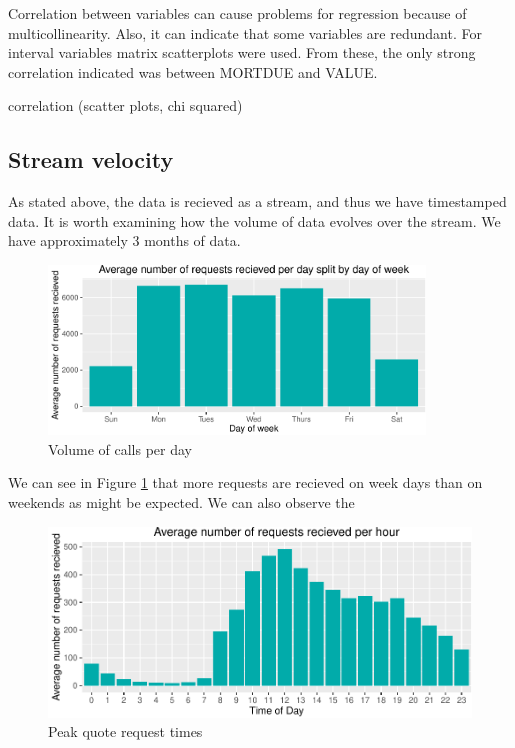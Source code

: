 Correlation between variables can cause problems for regression because of multicollinearity. Also, it can indicate that some variables are redundant. For interval variables matrix scatterplots were used. From these, the only strong correlation indicated was between MORTDUE and VALUE.



correlation (scatter plots, chi squared)


\subsection{Stream velocity}
\label{streaming-aspect}

As stated above, the data is recieved as a stream, and thus we have timestamped data. It is worth examining how the volume of data evolves
over the stream. We have approximately 3 months of data. 

\begin{figure}[h]
  \centering
  \includegraphics[width = 10cm]{exploration_files/figure-latex/observations_per_day-1.pdf}
  \caption{Volume of calls per day}
\label{fig:calls_per_day}
\end{figure}


We can see in Figure \ref{fig:calls_per_day} that more requests are recieved on week days than on weekends as might be expected. We can also observe the 

\begin{figure}[h]
  \centering
\includegraphics{exploration_files/figure-latex/distribution_of_requests-1.pdf}  
  \caption{Peak quote request times}
\label{fig:peak_times}
\end{figure}

